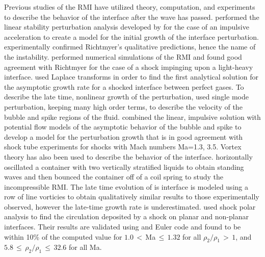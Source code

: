 Previous studies of the \ac{RMI} have utilized theory, computation,
and experiments to describe the behavior of the interface after the
wave has passed. \cite{Richtmyer1960} performed the linear stability
perturbation analysis developed by \cite{Taylor1950} for the case of
an impulsive acceleration to create a model for the initial growth of
the interface perturbation. \cite{Meshkov1969} experimentally
confirmed Richtmyer's qualitative predictions, hence the name of the
instability. \cite{Meyer1972} performed numerical simulations of the
\ac{RMI} and found good agreement with Richtmyer for the case of a
shock impinging upon a light-heavy interface. \cite{Fraley1986} used
Laplace transforms in order to find the first analytical solution for
the asymptotic growth rate for a shocked interface between perfect
gases. To describe the late time, nonlinear growth of the
perturbation, \cite{Zhang1997} used single mode perturbation, keeping
many high order terms, to describe the velocity of the bubble and
spike regions of the fluid. \cite{Sadot1998} combined the linear,
impulsive solution with potential flow models of the asymptotic
behavior of the bubble and spike to develop a model for the
perturbation growth that is in good agreement with shock tube
experiments for shocks with Mach numbers Ma=1.3, 3.5. Vortex theory
has also been used to describe the behavior of the
interface. \cite{Jacobs1996} horizontally oscillated a container with
two vertically stratified liquids to obtain standing waves and then
bounced the container off of a coil spring to study the incompressible
\ac{RMI}. The late time evolution of is interface is modeled using a
row of line vorticies to obtain qualitatively similar results to those
experimentally observed, however the late-time growth rate is
underestimated. \cite{Samtaney1994} used shock polar analysis to find
the circulation deposited by a shock on planar and non-planar
interfaces. Their results are validated using and Euler code and found
to be within 10\% of the computed value for $1.0\,<\,$Ma$\,\leq\,1.32$
for all $\rho_2/\rho_1\,>\,1$, and
$5.8\,\leq\,\rho_2/\rho_1\,\leq\,32.6$ for all Ma.

